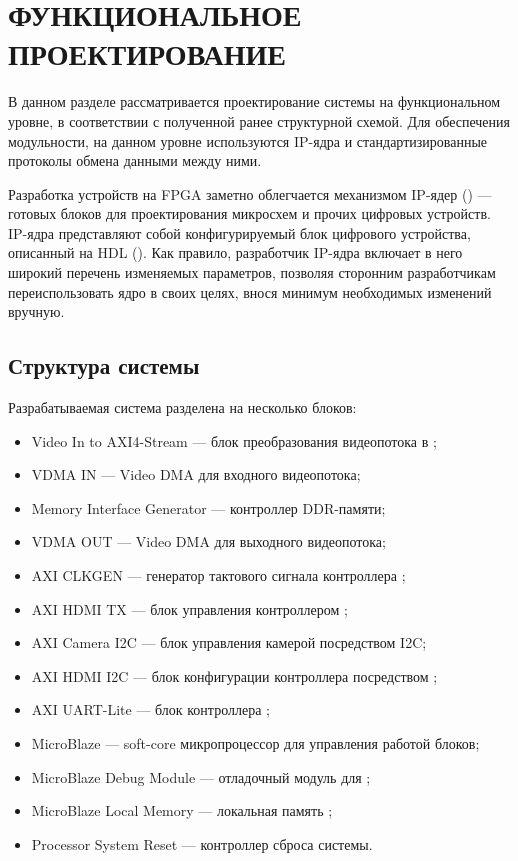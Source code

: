 \section{ФУНКЦИОНАЛЬНОЕ ПРОЕКТИРОВАНИЕ}
\label{sec:functional}

В данном разделе рассматривается проектирование системы на функциональном уровне, в
соответствии с полученной ранее структурной схемой. Для обеспечения модульности,
на данном уровне используются IP-ядра и стандартизированные протоколы обмена данными
между ними.

Разработка устройств на FPGA заметно облегчается механизмом IP-ядер () --- готовых
блоков для проектирования микросхем и прочих цифровых устройств. IP-ядра представляют собой
конфигурируемый блок цифрового устройства, описанный на HDL ().
Как правило, разработчик IP-ядра включает в него широкий перечень изменяемых параметров,
позволяя сторонним разработчикам переиспользовать ядро в своих целях, внося минимум необходимых
изменений вручную.

\subsection{Структура системы}
\label{sec:functional:structure}

Разрабатываемая система разделена на несколько блоков:

\begin{itemize}
  \item Video In to AXI4-Stream --- блок преобразования видеопотока в ;
  \item VDMA IN --- Video DMA для входного видеопотока;
  \item Memory Interface Generator --- контроллер DDR-памяти;
  \item VDMA OUT --- Video DMA для выходного видеопотока;
  \item AXI CLKGEN --- генератор тактового сигнала контроллера ;
  \item AXI HDMI TX --- блок управления контроллером ;
  \item AXI Camera I2C --- блок управления камерой посредством I2C;
  \item AXI HDMI I2C --- блок конфигурации контроллера  посредством ;
  \item AXI UART-Lite --- блок контроллера ;
  \item MicroBlaze --- soft-core микропроцессор для управления работой блоков;
  \item MicroBlaze Debug Module --- отладочный модуль для ;
  \item MicroBlaze Local Memory --- локальная память ;
  \item Processor System Reset --- контроллер сброса системы.
\end{itemize}

